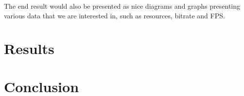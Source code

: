 \documentclass[nobiblatex]{LTHthesis}
\begin{document}
The end result would also be presented as nice diagrams and graphs presenting various data that we are interested in, such as resources, bitrate and FPS.

\chapter{Results}

\chapter{Conclusion}





\end{document}
